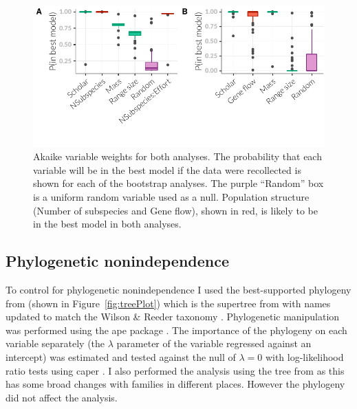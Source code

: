 \begin{knitrout}\footnotesize
{}\color{fgcolor}\begin{figure}[t]

{\centering \includegraphics[width=\textwidth,trim = 0 1cm 0 0]{figure/fstITPlots-1} 

}

\caption[Akaike variable weights for $F_{ST}$ analysis.]{Akaike variable weights for both analyses. The probability that each variable will be in the best model if the data were recollected is shown for each of the bootstrap analyses. The purple ``Random'' box is a uniform random variable used as a null. Population structure (Number of subspecies and Gene flow), shown in red, is likely to be in the best model in both analyses.}\label{fig:fstITPlots}
\end{figure}


\end{knitrout}


\subsection{Phylogenetic nonindependence}

To control for phylogenetic nonindependence I used the best-supported phylogeny from \textcite{fritz2009geographical} (shown in Figure~\ref{fig:treePlot}) which is the supertree from \cite{bininda2007delayed} with names updated to match the Wilson \& Reeder taxonomy \cite{wilson2005mammal}.
Phylogenetic manipulation was performed using the ape package \cite{ape}.
The importance of the phylogeny on each variable separately (the $\lambda$ parameter of the variable regressed against an intercept) was estimated and tested against the null of $\lambda = 0$ with log-likelihood ratio tests using caper \cite{caper}.
I also performed the analysis using the tree from \cite{jones2005bats} as this has some broad changes with families in different places.
However the phylogeny did not affect the analysis.

